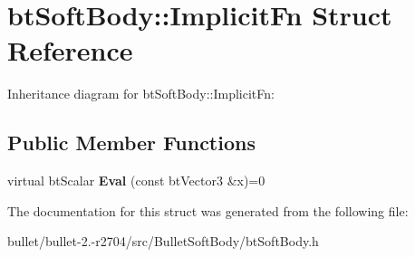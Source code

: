 \hypertarget{structbt_soft_body_1_1_implicit_fn}{\section{bt\+Soft\+Body\+:\+:Implicit\+Fn Struct Reference}
\label{structbt_soft_body_1_1_implicit_fn}
}


Inheritance diagram for bt\+Soft\+Body\+:\+:Implicit\+Fn\+:
\subsection*{Public Member Functions}
\begin{DoxyCompactItemize}
\item 
\hypertarget{structbt_soft_body_1_1_implicit_fn_a3bbaaae0b8f0c1baf636ebfcfd66b482}{virtual bt\+Scalar {\bfseries Eval} (const bt\+Vector3 \&x)=0}\label{structbt_soft_body_1_1_implicit_fn_a3bbaaae0b8f0c1baf636ebfcfd66b482}

\end{DoxyCompactItemize}


The documentation for this struct was generated from the following file\+:\begin{DoxyCompactItemize}
\item 
bullet/bullet-\/2.-\/r2704/src/\+Bullet\+Soft\+Body/bt\+Soft\+Body.\+h\end{DoxyCompactItemize}
